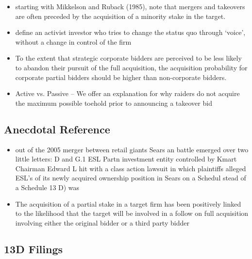 \documentclass[12pt]{article}
\begin{document}
\begin{itemize}
        \item starting with Mikkelson and Ruback (1985), note that mergers and takeovers are often preceded by the acquisition of a minority stake in the target. \citep{Greenwood2009}

        \item define an activist investor who tries to change the status quo through ‘voice’, without a change in control of the firm \citep{Greenwood2009}

        \item To the extent that strategic corporate bidders are perceived to be less likely to abandon their pursuit of the full acquisition, the acquisition probability for corporate partial bidders should be higher than non-corporate bidders.

        \item Active vs. Passive -- We offer an explanation for why raiders do not acquire the maximum possible toehold prior to announcing a takeover bid \citep{Goldman2005}

    \end{itemize}

\subsection{Anecdotal Reference}

    \begin{itemize}
        
        \item out of the 2005 merger between retail giants Sears an battle emerged over two little letters: D and G.1 ESL Partn investment entity controlled by Kmart Chairman Edward L hit with a class action lawsuit in which plaintiffs alleged ESL's of its newly acquired ownership position in Sears on a Schedul stead of a Schedule 13 D) was \citep{Giglia2018}

        \item The acquisition of a partial stake in a target firm has been positively linked to the likelihood that the target will be involved in a follow on full acquisition involving either the original bidder or a third party bidder \citep{Akhigbe2007}

        

    \end{itemize}

\subsection{13D Filings}
\end{document}
